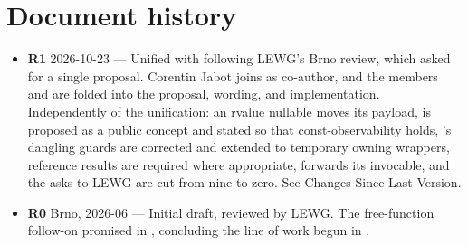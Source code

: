 \documentclass[a4paper,10pt,oneside,openany,final,article]{memoir}
\begin{document}
\chapter{Document history}

\begin{itemize}
\item \textbf{R1} 2026-10-23 --- Unified with \cite{P3413R0} following LEWG's
  Brno review, which asked for a single proposal. Corentin Jabot joins as
  co-author, and the members  and
   are folded into the proposal, wording, and
  implementation. Independently of the unification: an rvalue nullable moves
  its payload,  is proposed as a public concept and stated so
  that const-observability holds, 's dangling guards are
  corrected and extended to temporary owning wrappers, reference results are
  required where appropriate,  forwards its invocable, and
  the asks to LEWG are cut from nine to zero. See Changes Since Last Version.
\item \textbf{R0} Brno, 2026-06 --- Initial draft, reviewed by LEWG. The
  free-function follow-on promised in \cite{P2988R12}, concluding the line of
  work begun in \cite{P1255R13}.
\end{itemize}

\renewcommand{\bibname}{References}


\end{document}
